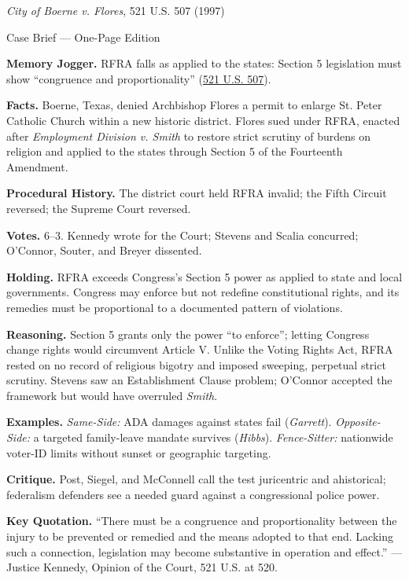 \documentclass[12pt]{article}
\begin{document}
\begin{center}
{\Large \textit{City of Boerne v. Flores}, 521 U.S. 507 (1997)\par}
\vspace{0.3em}
{\normalsize Case Brief --- One-Page Edition\par}
\end{center}

\textbf{Memory Jogger.} RFRA falls as applied to the states: Section 5 legislation must show ``congruence and proportionality'' (\href{https://supreme.justia.com/cases/federal/us/521/507/}{521 U.S. 507}).

\textbf{Facts.} Boerne, Texas, denied Archbishop Flores a permit to enlarge St. Peter Catholic Church within a new historic district. Flores sued under RFRA, enacted after \textit{Employment Division v. Smith} to restore strict scrutiny of burdens on religion and applied to the states through Section 5 of the Fourteenth Amendment.

\textbf{Procedural History.} The district court held RFRA invalid; the Fifth Circuit reversed; the Supreme Court reversed.

\textbf{Votes.} 6--3. Kennedy wrote for the Court; Stevens and Scalia concurred; O'Connor, Souter, and Breyer dissented.

\textbf{Holding.} RFRA exceeds Congress's Section 5 power as applied to state and local governments. Congress may enforce but not redefine constitutional rights, and its remedies must be proportional to a documented pattern of violations.

\textbf{Reasoning.} Section 5 grants only the power ``to enforce''; letting Congress change rights would circumvent Article V. Unlike the Voting Rights Act, RFRA rested on no record of religious bigotry and imposed sweeping, perpetual strict scrutiny. Stevens saw an Establishment Clause problem; O'Connor accepted the framework but would have overruled \textit{Smith}.

\textbf{Examples.} \emph{Same-Side:} ADA damages against states fail (\textit{Garrett}). \emph{Opposite-Side:} a targeted family-leave mandate survives (\textit{Hibbs}). \emph{Fence-Sitter:} nationwide voter-ID limits without sunset or geographic targeting.

\textbf{Critique.} Post, Siegel, and McConnell call the test juricentric and ahistorical; federalism defenders see a needed guard against a congressional police power.

\textbf{Key Quotation.} ``There must be a congruence and proportionality between the injury to be prevented or remedied and the means adopted to that end. Lacking such a connection, legislation may become substantive in operation and effect.'' --- Justice Kennedy, Opinion of the Court, 521 U.S. at 520.
\end{document}
